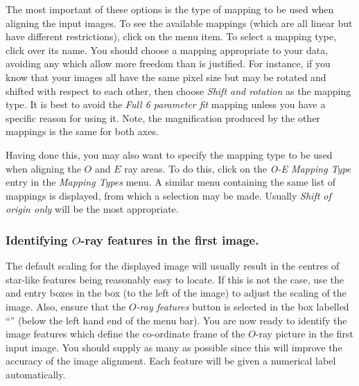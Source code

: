 The most important of these options is the type of mapping to be used
when aligning the input images. To see the available mappings (which are
all linear but have different restrictions), click on the  menu item. To select a mapping type,
click over its name. You should choose a mapping appropriate to your
data, avoiding any which allow more freedom than is justified. For
instance, if you know that your images all have the same pixel size but
may be rotated and shifted with respect to each other, then choose {\em
Shift and rotation} as the mapping type. It is best to avoid the {\em
Full 6 parameter fit} mapping unless you have a specific reason for using
it. Note, the magnification produced by the other mappings is the same
for both axes.

Having done this, you may also want to specify the mapping type to be
used when aligning the $O$ and $E$ ray areas. To do this, click on the
{\em O-E Mapping Type} entry in the {\em Mapping Types} menu. A similar
menu containing the same list of mappings is displayed, from which a
selection may be made. Usually {\em Shift of origin only} will be the
most appropriate.


\subsubsection {Identifying $O$-ray features in the first image.}
The default scaling for the displayed image will usually result in the
centres of star-like features being reasonably easy to locate. If this is
not the case, use the  and 
 entry boxes
in the  box
(to the left of the image) to adjust the scaling of the image. Also,
ensure that the {\em $O$-ray features} button is selected in the box
labelled ``'' (below the left hand
end of the menu bar). You are now ready to identify the image features
which define the co-ordinate frame of the $O$-ray picture in the first
input image. You should supply as many as possible since this will
improve the accuracy of the image alignment. Each feature will be given a
numerical label automatically.

